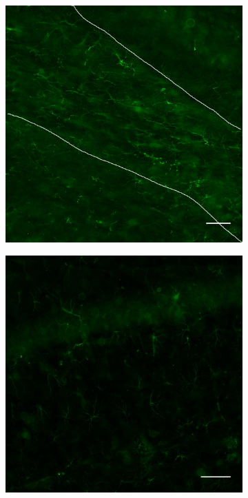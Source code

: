 \begin{figure}[h]
\begin{subfigure}[h]{0.245\textwidth}
			\includegraphics[width=\textwidth]{./Images/Immuno/Musk/MuSK_cc_50um.jpg}
		\end{subfigure}
		\begin{subfigure}[h]{0.245\textwidth}
			\caption{}
			\label{fig:locaMuSKca1}
			\includegraphics[width=\textwidth]{./Images/Immuno/Musk/MuSK_ca1_50um.jpg}

\end{subfigure}
\end{figure}
